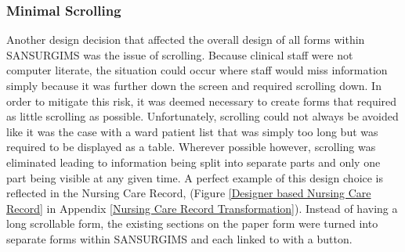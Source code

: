 \newpage
\subsubsection{Minimal Scrolling}
Another design decision that affected the overall design of all forms within SANSURGIMS was the issue of scrolling. Because clinical staff were not computer literate, the situation could occur where staff would miss information simply because it was further down the screen and required scrolling down. In order to mitigate this risk, it was deemed necessary to create forms that required as little scrolling as possible. Unfortunately, scrolling could not always be avoided like it was the case with a ward patient list that was simply too long but was required to be displayed as a table. Wherever possible however, scrolling was eliminated leading to information being split into separate parts and only one part being visible at any given time. A perfect example of this design choice is reflected in the Nursing Care Record, (Figure \ref{Designer based Nursing Care Record} in Appendix \ref{Nursing Care Record Transformation}). Instead of having a long scrollable form, the existing sections on the paper form were turned into separate forms within SANSURGIMS and each linked to with a button.

